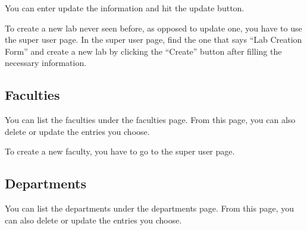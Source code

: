 \documentclass[letterpaper,10pt,english]{sphinxmanual}
\begin{document}
\begin{figure}[htbp]
\centering

\noindent{}
\end{figure}

You can enter update the information and hit the update button.

To create a new lab never seen before, as opposed to update one, you have to use the super user page.
In the super user page, find the one that says “Lab Creation Form” and create a new lab by clicking
the “Create” button after filling the necessary information.

\begin{figure}[htbp]
\centering

\noindent{}
\end{figure}


\subsection{Faculties}
\label{\detokenize{user/kaplan:faculties}}
You can list the faculties under the faculties page. From this page, you can also delete or update
the entries you choose.

To create a new faculty, you have to go to the super user page.

\begin{figure}[htbp]
\centering

\noindent{}
\end{figure}

\begin{figure}[htbp]
\centering

\noindent{}
\end{figure}

\begin{figure}[htbp]
\centering

\noindent{}
\end{figure}


\subsection{Departments}
\label{\detokenize{user/kaplan:departments}}
You can list the departments under the departments page. From this page, you can also delete or update
the entries you choose.
\end{document}
